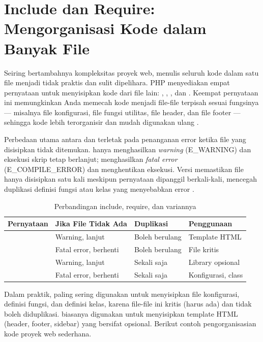 ﻿\section{Include dan Require: Mengorganisasi Kode dalam Banyak File}

Seiring bertambahnya kompleksitas proyek web, menulis seluruh kode dalam satu file menjadi tidak praktis dan sulit dipelihara. PHP menyediakan empat pernyataan untuk menyisipkan kode dari file lain: , , , dan . Keempat pernyataan ini memungkinkan Anda memecah kode menjadi file-file terpisah sesuai fungsinya --- misalnya file konfigurasi, file fungsi utilitas, file header, dan file footer --- sehingga kode lebih terorganisir dan mudah digunakan ulang \cite{phpManual}.

Perbedaan utama antara  dan  terletak pada penanganan error ketika file yang disisipkan tidak ditemukan.  hanya menghasilkan \textit{warning} (E\_WARNING) dan eksekusi skrip tetap berlanjut;  menghasilkan \textit{fatal error} (E\_COMPILE\_ERROR) dan menghentikan eksekusi. Versi  memastikan file hanya disisipkan satu kali meskipun pernyataan dipanggil berkali-kali, mencegah duplikasi definisi fungsi atau kelas yang menyebabkan error \cite{phpRightWay}.

\begin{table}[H]
\centering
\begin{tabular}{|P{3cm}|P{3.5cm}|P{3cm}|P{2.5cm}|}
\hline
\textbf{Pernyataan} & \textbf{Jika File Tidak Ada} & \textbf{Duplikasi} & \textbf{Penggunaan} \\
\hline
{} & Warning, lanjut & Boleh berulang & Template HTML \\
\hline
{} & Fatal error, berhenti & Boleh berulang & File kritis \\
\hline
{} & Warning, lanjut & Sekali saja & Library opsional \\
\hline
{} & Fatal error, berhenti & Sekali saja & Konfigurasi, class \\
\hline
\end{tabular}
\caption{Perbandingan include, require, dan variannya}
\end{table}

Dalam praktik,  paling sering digunakan untuk menyisipkan file konfigurasi, definisi fungsi, dan definisi kelas, karena file-file ini kritis (harus ada) dan tidak boleh diduplikasi.  biasanya digunakan untuk menyisipkan template HTML (header, footer, sidebar) yang bersifat opsional. Berikut contoh pengorganisasian kode proyek web sederhana.


